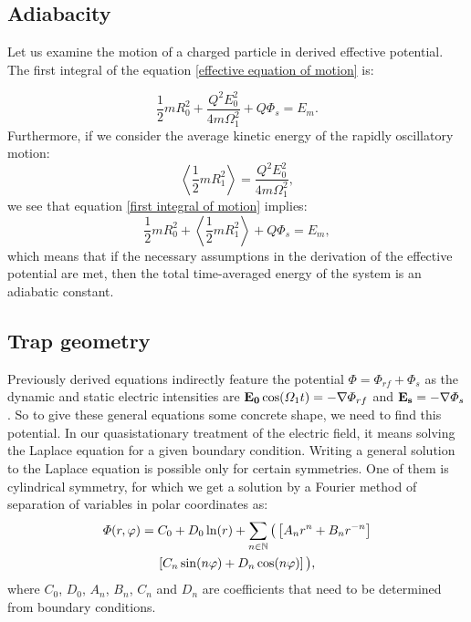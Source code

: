 \subsection{Adiabacity}

Let us examine the motion of a charged particle in derived effective potential. The first integral of the equation \eqref{effective equation of motion} is:

\begin{equation}
	\label{first integral of motion}
	\dfrac{1}{2}m R_0^2 + \dfrac{Q^2 E_0^2}{4 m \Omega_1^2} + Q\Phi_s = E_m.
\end{equation}
Furthermore, if we consider the average kinetic energy of the rapidly oscillatory motion:
\begin{equation}
	\left\langle \dfrac{1}{2} m R_1^2 \right\rangle = \dfrac{Q^2 E_0^2}{4 m \Omega_1^2},
\end{equation}
we see that equation \eqref{first integral of motion} implies:
\begin{equation}
	\dfrac{1}{2}m R_0^2 + \left\langle \dfrac{1}{2} m R_1^2 \right\rangle + Q\Phi_s = E_m,
\end{equation}
which means that if the necessary assumptions in the derivation of the effective potential are met, then the total time-averaged energy of the system is an adiabatic constant.
\subsection{Trap geometry}

Previously derived equations indirectly feature the potential $\Phi = \Phi_{rf} + \Phi_s$ as the dynamic and static electric intensities are $\vb{E_0}\cos(\Omega_1 t) = -\nabla \Phi_{rf}$ and $\vb{E_s} = -\nabla \Phi_s$. So to give these general equations some concrete shape, we need to find this potential. In our quasistationary treatment of the electric field, it means solving the Laplace equation for a given boundary condition. Writing a general solution to the Laplace equation is possible only for certain symmetries. One of them is cylindrical symmetry, for which we get a solution by a Fourier method of separation of variables in polar coordinates as:
\begin{multline}
	\label{cylindrical symmetry potential}
	\Phi(r, \varphi) = C_0 + D_0 \ln(r) + \sum_{n \in \mathbb{N}} \big( \left[A_n r^{n} + B_n r^{-n} \right] \\ 
	\left[ C_n \sin(n\varphi) + D_n \cos(n\varphi) \right] \big),
\end{multline}
where $C_0$, $D_0$, $A_n$, $B_n$, $C_n$ and $D_n$ are coefficients that need to be determined from boundary conditions. 


